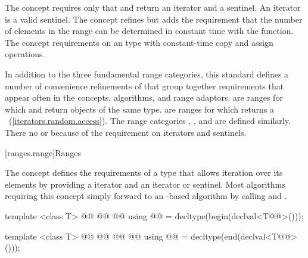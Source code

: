 \begin{addedblock}
\pnum
The  concept requires only that  and 
return an iterator and a sentinel. \enternote An iterator is a valid sentinel.
\exitnote The  concept refines  but adds
the requirement that the number of elements in the range can be determined
in constant time with the  function. The  concept
 requirements on an  type
with constant-time copy and assign operations.

\pnum
In addition to the three fundamental range categories, this standard defines
a number of convenience refinements of  that group together requirements
that appear often in the concepts, algorithms, and range adaptors.
 are ranges for which  and  return objects of the
same type.  are ranges for which
 returns a 
~(\ref{iterators.random.access}). The range
categories ,
,
 and
 are defined similarly.
\enternote There  no  or
 because of the 
requirement on iterators and sentinels. \exitnote {}

[ranges.range]{Ranges}

\pnum
The  concept defines the requirements of a type that allows
iteration over its elements by providing a  iterator and an
 iterator or sentinel.
\enternote Most algorithms requiring this concept simply forward to an
-based algorithm by calling  and . \exitnote

\begin{itemdecl}
template <class T>
  @@
    @@
  @\newtxt{\}}@
using @@ = decltype(begin(declval<T@\newtxt{\&}@>()));

template <class T>
  @@
    @@
    @@
  @\newtxt{\}}@
using @@ = decltype(end(declval<T@\newtxt{\&}@>()));


\end{itemdecl}
\end{addedblock}
